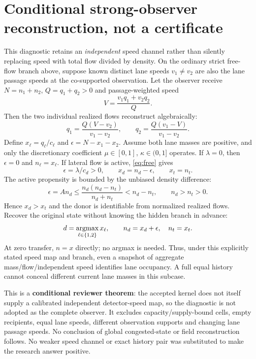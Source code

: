 \documentclass[10pt,a4paper]{article}
\begin{document}
\section{Conditional strong-observer reconstruction, not a certificate}
This diagnostic retains an \emph{independent} speed channel rather than silently
replacing speed with total flow divided by density. On the ordinary strict
free-flow branch above, suppose known distinct lane speeds $v_1\ne v_2$ are
also the lane passage speeds at the co-supported observation. Let the observer
receive $N=n_1+n_2$, $Q=q_1+q_2>0$ and passage-weighted speed
\begin{equation}
 V=\frac{v_1 q_1+v_2 q_2}{Q}.
\end{equation}
Then the two individual realized flows reconstruct algebraically:
\begin{equation}
 q_1=\frac{Q(V-v_2)}{v_1-v_2},\qquad
 q_2=\frac{Q(v_1-V)}{v_1-v_2}.
\end{equation}
Define $x_\ell=q_\ell/c_\ell$ and $\epsilon=N-x_1-x_2$.
Assume both lane masses are positive, and only the discretionary coefficient
$\mu\in[0,1]$, $\kappa\in(0,1]$ operates. If $\lambda=0$, then $\epsilon=0$
and $n_\ell=x_\ell$. If lateral flow is active, \eqref{eq:free} gives
\begin{equation}
 \epsilon=\lambda/c_d>0,\qquad x_d=n_d-\epsilon,\qquad x_t=n_t.
\end{equation}
The active propensity is bounded by the unbiased density difference:
\begin{equation}
 \epsilon=A n_d\leq\frac{n_d(n_d-n_t)}{n_d+n_t}<n_d-n_t,
 \qquad n_d>n_t>0.
\end{equation}
Hence $x_d>x_t$ and the donor is identifiable from normalized realized flows.
Recover the original state without knowing the hidden branch in advance:
\begin{equation}
 d=\mathop{\rm argmax}_{\ell\in\{1,2\}}x_\ell,\qquad
 n_d=x_d+\epsilon,\quad n_t=x_t.
\end{equation}
At zero transfer, $n=x$ directly; no argmax is needed.
Thus, under this explicitly stated speed map and branch, even a snapshot of
aggregate mass/flow/independent speed identifies lane occupancy. A full equal
history cannot conceal different current lane masses in this subcase.

This is a \textbf{conditional reviewer theorem}: the accepted kernel does not
itself supply a calibrated independent detector-speed map, so the diagnostic is
not adopted as the complete observer. It excludes capacity/supply-bound cells,
empty recipients, equal lane speeds, different observation supports and changing
lane passage speeds. No conclusion of global congested-state or field
reconstruction follows. No weaker speed channel or exact history pair was
substituted to make the research answer positive.
\newpage
\end{document}
